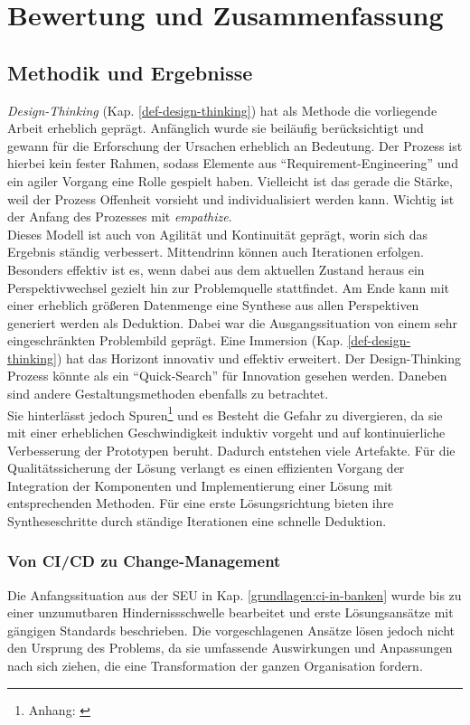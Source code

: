 \chapter{Bewertung und Zusammenfassung}
\label{chapter:evaluation}

\section{Methodik und Ergebnisse}
\emph{Design-Thinking} (Kap. \ref{def-design-thinking}) hat als Methode die vorliegende Arbeit erheblich geprägt. Anfänglich wurde sie beiläufig berücksichtigt und gewann für die Erforschung der Ursachen erheblich an Bedeutung. Der Prozess ist hierbei kein fester Rahmen, sodass Elemente aus \enquote{Requirement-Engineering} und ein agiler Vorgang eine Rolle gespielt haben. Vielleicht ist das gerade die Stärke, weil der Prozess Offenheit vorsieht und individualisiert werden kann. Wichtig ist der Anfang des Prozesses mit \emph{empathize}.
\medskip
\\
Dieses Modell ist auch von Agilität und Kontinuität geprägt, worin sich das Ergebnis ständig verbessert. Mittendrinn können auch Iterationen erfolgen.
Besonders effektiv ist es, wenn dabei aus dem aktuellen Zustand heraus ein Perspektivwechsel gezielt hin zur Problemquelle stattfindet. Am Ende kann mit einer erheblich größeren Datenmenge eine Synthese aus allen Perspektiven generiert werden als Deduktion. Dabei war die Ausgangssituation von einem sehr eingeschränkten Problembild geprägt. Eine Immersion (Kap. \ref{def-design-thinking}) hat das Horizont innovativ und effektiv erweitert. 
Der Design-Thinking Prozess könnte als ein \enquote{Quick-Search} für Innovation gesehen werden. Daneben sind andere Gestaltungsmethoden ebenfalls zu betrachtet.
\medskip
\\
Sie hinterlässt jedoch Spuren\footnote{Anhang: \label{appendix:docker}} und es Besteht die Gefahr zu divergieren, da sie mit einer erheblichen Geschwindigkeit induktiv vorgeht und auf kontinuierliche Verbesserung der Prototypen beruht. Dadurch entstehen viele Artefakte.
Für die Qualitätssicherung der Lösung verlangt es einen effizienten Vorgang der Integration der Komponenten und Implementierung einer Lösung mit entsprechenden Methoden. Für eine erste Lösungsrichtung bieten ihre Syntheseschritte durch ständige Iterationen eine schnelle Deduktion.

\subsection{Von CI/CD zu Change-Management}
Die Anfangssituation aus der \ac{SEU} in Kap. \ref{grundlagen:ci-in-banken} wurde bis zu einer unzumutbaren Hindernissschwelle bearbeitet und erste Lösungsansätze mit gängigen Standards beschrieben. Die vorgeschlagenen Ansätze lösen jedoch nicht den Ursprung des Problems, da sie umfassende Auswirkungen und Anpassungen nach sich ziehen, die eine Transformation der ganzen Organisation fordern. 

